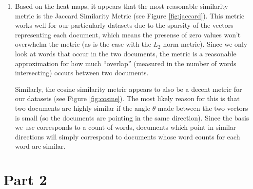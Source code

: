 \documentclass[12pt]{article}
\begin{document}
\begin{enumerate}[label=(\alph*)]
  \item 
    Based on the heat maps, it appears that the most reasonable similarity metric is the Jaccard Similarity Metric (see Figure \ref{fig:jaccard}). This metric works well for our particularly datasets due to the sparsity of the vectors representing each document, which means the presense of zero values won't overwhelm the metric (as is the case with the $L_2$ norm metric). Since we only look at words that occur in the two documents, the metric is a reasonable approximation for how much ``overlap'' (measured in the number of words intersecting) occurs between two documents.

    Similarly, the cosine similarity metric appears to also be a decent metric for our datasets (see Figure \ref{fig:cosine}). The most likely reason for this is that two documents are highly similar if the angle $\theta$ made between the two vectors is small (so the documents are pointing in the same direction). Since the basis we use corresponds to a count of words, documents which point in similar directions will simply correspond to documents whose word counts for each word are similar. 
\end{enumerate}

\newpage
\section*{Part 2}
\end{document}
